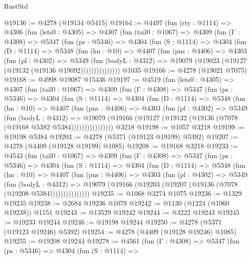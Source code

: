 \begin{lexlean}{RustStd}
\begin{coremodule}
{\begin{coremodule}
{{{{{{{{{{{{{{{{{{{{{{{{{{{{{{{{{{{@19136 := @4278 (@19134 @5415)
@19164 := @4497
    (fun (rty : @1114) =>
    @4306
      (fun (lets0 : @4305) =>
      @4307
        (fun (tail0 : @1067) =>
        @4309
          (fun (Γ : @4308) =>
          @5347
            (fun (ps : @5346) =>
            @4304
              (fun (S : @1114) =>
              @4304
                (fun (D : @1114) =>
                @5348
                  (fun (hn : @10) =>
                  @4407
                    (fun (pns : @4406) =>
                    @4303
                      (fun (pl : @4302) =>
                      @5349
                        (fun (bodyL : @4312) =>
                        @19079 (@19023 (@19127 (@19132 (@19136 @19092)))))))))))))))
    @1035
@19166 := @4278 (@19021 @7075)
@19168 := @4998 @19087 @15436
@19197 := @4519
    (fun (lets0 : @4305) =>
    @4307
      (fun (tail0 : @1067) =>
      @4309
        (fun (Γ : @4308) =>
        @5347
          (fun (ps : @5346) =>
          @4304
            (fun (S : @1114) =>
            @4304
              (fun (D : @1114) =>
              @5348
                (fun (hn : @10) =>
                @4407
                  (fun (pns : @4406) =>
                  @4303
                    (fun (pl : @4302) =>
                    @5349
                      (fun (bodyL : @4312) =>
                      @19079
                        (@19166 (@19127 (@19132 (@19136 (@7078 (@19168 @5382 @5384))))))))))))))))
    @3218
@19198 := @1057 @3218
@19199 := @19198 @5384
@19203 := @4278 (@5371 (@19123 @19199) @5392)
@19207 := @4278 (@4409 (@19128 @19199) @1085)
@19208 := @19168 @3218
@19233 := @4543
    (fun (tail0 : @1067) =>
    @4309
      (fun (Γ : @4308) =>
      @5347
        (fun (ps : @5346) =>
        @4304
          (fun (S : @1114) =>
          @4304
            (fun (D : @1114) =>
            @5348
              (fun (hn : @10) =>
              @4407
                (fun (pns : @4406) =>
                @4303
                  (fun (pl : @4302) =>
                  @5349
                    (fun (bodyL : @4312) =>
                    @19079 (@19166 (@19203 (@19207 (@19136 (@7078 (@19208 @5384)))))))))))))))
@19235 := @1068 @3274 @1075
@19236 := @1329 @19235
@19238 := @2684 @19236 @1079
@19242 := @1130 (@1224 (@1060 @19238)) @1151
@19243 := @13529 @19242
@19244 := @3222 @19243
@19245 := @19233 @19244
@19246 := @19198 @19244
@19250 := @4278 (@5371 (@19123 @19246) @5392)
@19254 := @4278 (@4409 (@19128 @19246) @1085)
@19255 := @19208 @19244
@19278 := @4561
    (fun (Γ : @4308) =>
    @5347
      (fun (ps : @5346) =>
      @4304
        (fun (S : @1114) =>
}}}}}}}}}}}}}}}}}}}}}}}}}}}}}}}}}}}
\end{coremodule}}
\end{coremodule}
\end{lexlean}
